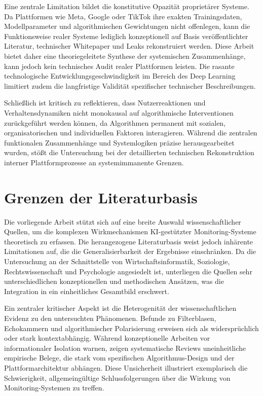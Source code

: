 Eine zentrale Limitation bildet die konstitutive Opazität proprietärer Systeme. Da Plattformen wie Meta, Google oder TikTok ihre exakten Trainingsdaten, Modellparameter und algorithmischen Gewichtungen nicht offenlegen, kann die Funktionsweise realer Systeme lediglich konzeptionell auf Basis veröffentlichter Literatur, technischer Whitepaper und Leaks rekonstruiert werden. Diese Arbeit bietet daher eine theoriegeleitete Synthese der systemischen Zusammenhänge, kann jedoch kein technisches Audit realer Plattformen leisten. Die rasante technologische Entwicklungsgeschwindigkeit im Bereich des Deep Learning limitiert zudem die langfristige Validität spezifischer technischer Beschreibungen.

Schließlich ist kritisch zu reflektieren, dass Nutzerreaktionen und Verhaltensdynamiken nicht monokausal auf algorithmische Interventionen zurückgeführt werden können, da Algorithmen permanent mit sozialen, organisatorischen und individuellen Faktoren interagieren. Während die zentralen funktionalen Zusammenhänge und Systemlogiken präzise herausgearbeitet wurden, stößt die Untersuchung bei der detaillierten technischen Rekonstruktion interner Plattformprozesse an systemimmanente Grenzen.

\section{Grenzen der Literaturbasis}

Die vorliegende Arbeit stützt sich auf eine breite Auswahl wissenschaftlicher Quellen, um die komplexen Wirkmechanismen \ac{KI}-gestützter Monitoring-Systeme theoretisch zu erfassen. Die herangezogene Literaturbasis weist jedoch inhärente Limitationen auf, die die Generalisierbarkeit der Ergebnisse einschränken. Da die Untersuchung an der Schnittstelle von Wirtschaftsinformatik, Soziologie, Rechtswissenschaft und Psychologie angesiedelt ist, unterliegen die Quellen sehr unterschiedlichen konzeptionellen und methodischen Ansätzen, was die Integration in ein einheitliches Gesamtbild erschwert.

Ein zentraler kritischer Aspekt ist die Heterogenität der wissenschaftlichen Evidenz zu den untersuchten Phänomenen. Befunde zu Filterblasen, Echokammern und algorithmischer Polarisierung erweisen sich als widersprüchlich oder stark kontextabhängig. Während konzeptionelle Arbeiten vor informationaler Isolation warnen, zeigen systematische Reviews uneinheitliche empirische Belege, die stark vom spezifischen Algorithmus-Design und der Plattformarchitektur abhängen. Diese Unsicherheit illustriert exemplarisch die Schwierigkeit, allgemeingültige Schlussfolgerungen über die Wirkung von Monitoring-Systemen zu treffen.

